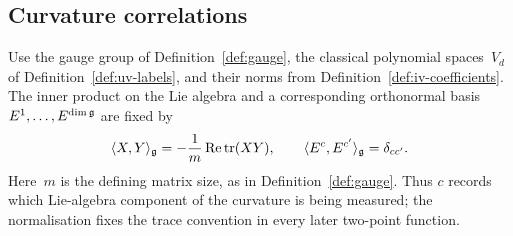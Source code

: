 \subsection{Curvature correlations}\label{subsec:mx-curvature}

Use the gauge group of Definition~\ref{def:gauge}, the classical polynomial spaces~$V_d$ of Definition~\ref{def:uv-labels}, and their norms from Definition~\ref{def:iv-coefficients}.
The inner product on the Lie algebra and a corresponding orthonormal basis~$E^1,\ldots,E^{\dim\mathfrak g}$ are fixed by
\begin{equation}\label{eq:mx-colors}
 \langle X,Y\rangle_{\mathfrak g}=-\frac{1}{m}\operatorname{Re}\operatorname{tr}(XY),
 \qquad \langle E^c,E^{c'}\rangle_{\mathfrak g}=\delta_{cc'}.
\end{equation}
Here~$m$ is the defining matrix size, as in Definition~\ref{def:gauge}. Thus $c$ records which Lie-algebra component of the curvature is being measured; the normalisation fixes the trace convention in every later two-point function.

